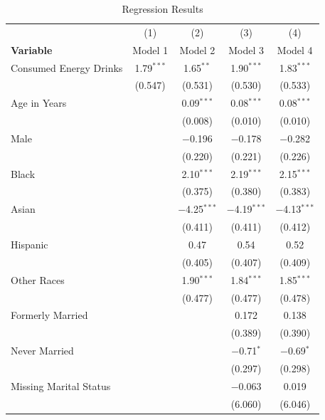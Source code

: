 \begin{table}[htbp]
\centering
\caption{Regression Results}
\label{tab:regression}
\small
\begin{tabular}{lcccc}
\toprule
 & (1) & (2) & (3) & (4) \\
\textbf{Variable} & Model 1 & Model 2 & Model 3 & Model 4 \\
\midrule
Consumed Energy Drinks & 1.79$^{***}$ & 1.65$^{**}$ & 1.90$^{***}$ & 1.83$^{***}$ \\
                       & (0.547) & (0.531) & (0.530) & (0.533) \\
Age in Years           &         & 0.09$^{***}$ & 0.08$^{***}$ & 0.08$^{***}$ \\
                       &         & (0.008) & (0.010) & (0.010) \\
Male                   &         & $-$0.196 & $-$0.178 & $-$0.282 \\
                       &         & (0.220) & (0.221) & (0.226) \\
Black                  &         & 2.10$^{***}$ & 2.19$^{***}$ & 2.15$^{***}$ \\
                       &         & (0.375) & (0.380) & (0.383) \\
Asian                  &         & $-$4.25$^{***}$ & $-$4.19$^{***}$ & $-$4.13$^{***}$ \\
                       &         & (0.411) & (0.411) & (0.412) \\
Hispanic               &         & 0.47 & 0.54 & 0.52 \\
                       &         & (0.405) & (0.407) & (0.409) \\
Other Races            &         & 1.90$^{***}$ & 1.84$^{***}$ & 1.85$^{***}$ \\
                       &         & (0.477) & (0.477) & (0.478) \\
Formerly Married       &         &         & 0.172 & 0.138 \\
                       &         &         & (0.389) & (0.390) \\
Never Married          &         &         & $-$0.71$^{*}$ & $-$0.69$^{*}$ \\
                       &         &         & (0.297) & (0.298) \\
Missing Marital Status &         &         & $-$0.063 & 0.019 \\
                       &         &         & (6.060) & (6.046) \\

\end{tabular}
\end{table}
